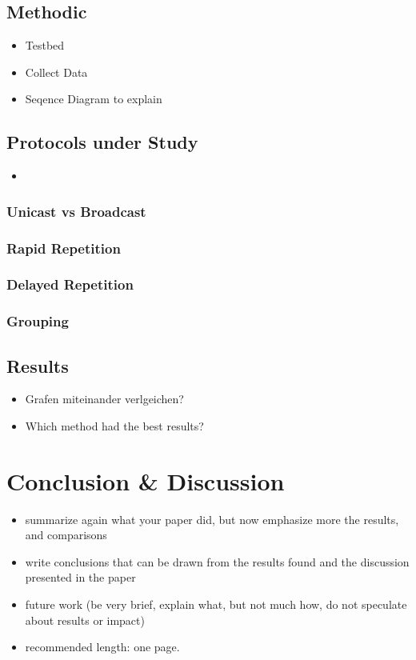 \documentclass[]{ccs-thesis}
\begin{document}
\section{Methodic}
\begin{itemize}
	\item Testbed
	\item Collect Data
	\item Seqence Diagram to explain 
\end{itemize}

\section{Protocols under Study}
\begin{itemize}
	\item 
\end{itemize}
\subsection*{Unicast vs Broadcast}
\subsection*{Rapid Repetition}
\subsection*{Delayed Repetition}
\subsection*{Grouping}

\section{Results}
\begin{itemize}
	\item Grafen miteinander verlgeichen?
	\item Which method had the best results?
\end{itemize}

\chapter{Conclusion \& Discussion}
\begin{itemize}
\item summarize again what your paper did, but now emphasize more the results, and comparisons
\item write conclusions that can be drawn from the results found and the discussion presented in the paper
\item future work (be very brief, explain what, but not much how, do not speculate about results or impact)
\item recommended length: one page.
\end{itemize}
\end{document}
